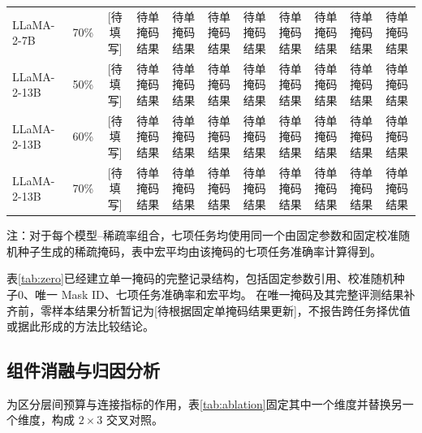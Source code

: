 \documentclass[UTF8,fontset=fandol]{ctexart}
\begin{document}
\begin{table}[!htbp]
\begin{tabular*}{0.98\textwidth}{@{\extracolsep{\fill}}llcllllllll@{}}
LLaMA-2-7B  & 70\% & [待填写] & 待单掩码结果 & 待单掩码结果 & 待单掩码结果 & 待单掩码结果 & 待单掩码结果 & 待单掩码结果 & 待单掩码结果 & 待单掩码结果 \\
LLaMA-2-13B & 50\% & [待填写] & 待单掩码结果 & 待单掩码结果 & 待单掩码结果 & 待单掩码结果 & 待单掩码结果 & 待单掩码结果 & 待单掩码结果 & 待单掩码结果 \\
LLaMA-2-13B & 60\% & [待填写] & 待单掩码结果 & 待单掩码结果 & 待单掩码结果 & 待单掩码结果 & 待单掩码结果 & 待单掩码结果 & 待单掩码结果 & 待单掩码结果 \\
LLaMA-2-13B & 70\% & [待填写] & 待单掩码结果 & 待单掩码结果 & 待单掩码结果 & 待单掩码结果 & 待单掩码结果 & 待单掩码结果 & 待单掩码结果 & 待单掩码结果 \\
\bottomrule
\end{tabular*}
\vspace{2pt}
\parbox{0.98\textwidth}{\scriptsize
注：对于每个模型--稀疏率组合，七项任务均使用同一个由固定参数和固定校准随机种子生成的稀疏掩码，表中宏平均由该掩码的七项任务准确率计算得到。}
\end{table}

表\ref{tab:zero}已经建立单一掩码的完整记录结构，包括固定参数引用、校准随机种子0、唯一 Mask ID、七项任务准确率和宏平均。
在唯一掩码及其完整评测结果补齐前，零样本结果分析暂记为[待根据固定单掩码结果更新]，不报告跨任务择优值或据此形成的方法比较结论。

\FloatBarrier
\subsection{组件消融与归因分析}

为区分层间预算与连接指标的作用，表\ref{tab:ablation}固定其中一个维度并替换另一个维度，构成
$2\times3$ 交叉对照。
\end{document}
